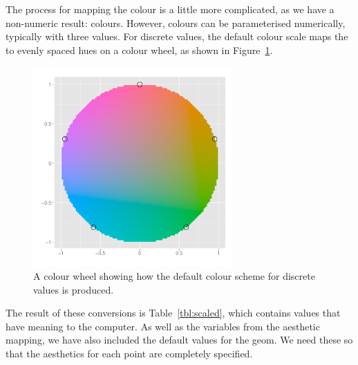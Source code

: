 The process for mapping the colour is a little more complicated, as we have a  non-numeric result: colours.  However, colours can be parameterised numerically, typically with three values.  For discrete values, the default colour scale maps the  to evenly spaced hues on a colour wheel, as shown in  Figure~\ref{fig:colour-wheel}.

\begin{figure}[htbp]
  \centering
    \includegraphics[width=3in]{colour-wheel.pdf}
  \caption{A colour wheel showing how the default colour scheme for discrete values is produced.}
  \label{fig:colour-wheel}
\end{figure}

The result of these conversions is Table~\ref{tbl:scaled}, which contains values that have meaning to the computer.  As well as the variables from the aesthetic mapping, we have also included the default values for the geom.  We need these so that the aesthetics for each point are completely specified.





